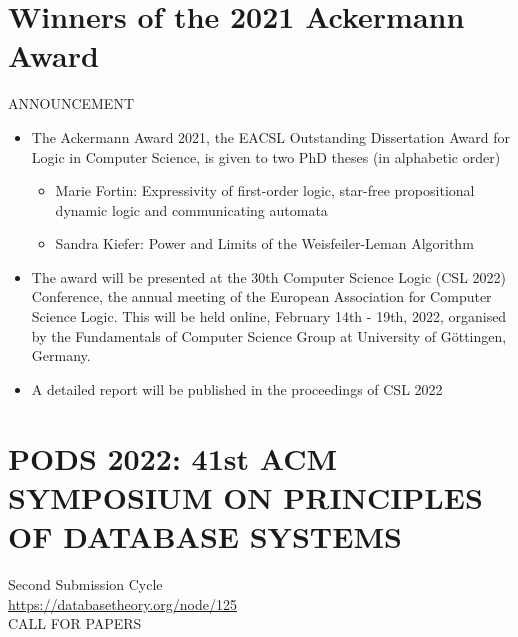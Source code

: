 \documentclass[prodmode,acmtecs]{acmsmall} %
\begin{document}
\section{Winners of the 2021 Ackermann Award}\label{Winnersofthe2021AckermannAward}ANNOUNCEMENT 

\begin{itemize}\item  The Ackermann Award 2021, the EACSL Outstanding Dissertation Award for Logic in Computer Science, is given to two PhD theses (in alphabetic order) 
 
\begin{itemize}\item  Marie Fortin: Expressivity of first-order logic, star-free propositional dynamic logic and communicating automata
\item  Sandra Kiefer: Power and Limits of the Weisfeiler-Leman Algorithm
\end{itemize} 
\item  The award will be presented at the 30th Computer Science Logic (CSL 2022) Conference, the annual meeting of the European Association for Computer Science Logic. This will be held online, February 14th - 19th, 2022, organised by the Fundamentals of Computer Science Group at University of Göttingen, Germany. 
 
\item  A detailed report will be published in the proceedings of CSL 2022 
 
\end{itemize}\section{PODS 2022: 41st ACM SYMPOSIUM ON PRINCIPLES OF DATABASE SYSTEMS}\label{PODS2022}  Second Submission Cycle\\ 
  \href{https://databasetheory.org/node/125}{https://databasetheory.org/node/125}\\ 
CALL FOR PAPERS 
\end{document}
